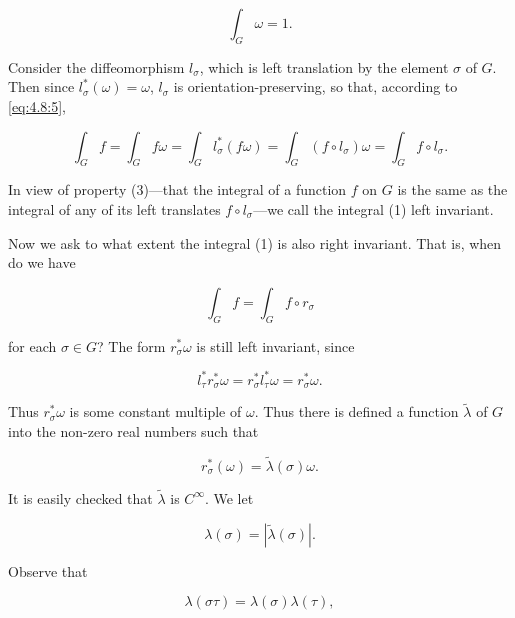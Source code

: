 \begin{equation}
\tag{2}\label{eq:4.11:2}
\int_{G}\omega=1.
\end{equation}

Consider the diffeomorphism $l_{\sigma}$, which is left translation by the element $\sigma$ of $G$. Then since $l_{\sigma}^{*}(\omega) = \omega$, $l_{\sigma}$ is orientation-preserving, so that, according to \eqref{eq:4.8:5},

\begin{equation}
\tag{3}\label{eq:4.11:3}
\int_{G}f=\int_{G}f\omega=\int_{G}l_{\sigma}^{*}(f\omega)=\int_{G}(f\circ l_{\sigma})\omega=\int_{G}f\circ l_{\sigma}.
\end{equation}

In view of property (3)—that the integral of a function $f$ on $G$ is the same as the integral of any of its left translates $f\circ l_\sigma$—we call the integral (1) left invariant.

Now we ask to what extent the integral (1) is also right invariant. That is, when do we have

\begin{equation}
\tag{4}\label{eq:4.11:4}
\int_{G}f=\int_{G}f\circ r_{\sigma}
\end{equation}

for each $\sigma \in G$? The form $r_{\sigma}^{*}\omega$ is still left invariant, since

\[
l_{\tau}^{*}r_{\sigma}^{*}\omega=r_{\sigma}^{*}l_{\tau}^{*}\omega=r_{\sigma}^{*}\omega.
\]

Thus $r_{\sigma}^{*}\omega$ is some constant multiple of $\omega$. Thus there is defined a function $\tilde{\lambda}$ of $G$ into the non-zero real numbers such that

\begin{equation}
\tag{5}\label{eq:4.11:5}
r_{\sigma}^{*}(\omega)=\tilde{\lambda}(\sigma)\omega.
\end{equation}

It is easily checked that  $ \tilde{\lambda} $ is  $ C^{\infty} $. We let

\begin{equation}
\tag{6}\label{eq:4.11:6}
\lambda(\sigma)=|\tilde{\lambda}(\sigma)|.
\end{equation}

Observe that

\begin{equation}
\tag{7}\label{eq:4.11:7}
\lambda(\sigma\tau)=\lambda(\sigma)\lambda(\tau),
\end{equation}

